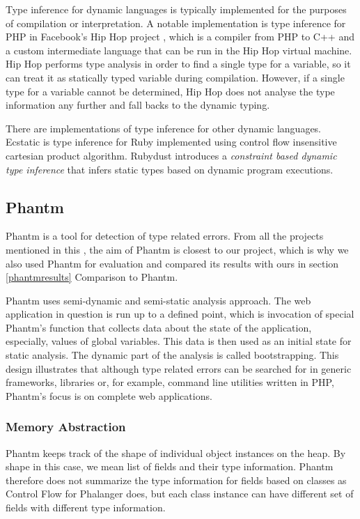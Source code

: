     Type inference for dynamic languages is typically implemented 
    for the purposes of compilation or interpretation. A notable implementation 
    is type inference for PHP in Facebook's Hip Hop project \cite{zhao2012hiphop}, 
    which is a compiler from PHP to C++ and a custom intermediate language 
    that can be run in the Hip Hop virtual machine. Hip Hop performs type 
    analysis in order to find a single type for a variable, so it can treat 
    it as statically typed variable during compilation. However, if a single 
    type for a variable cannot be determined, Hip Hop does not analyse 
    the type information any further and fall backs to the dynamic typing.    
        
    There are implementations of type inference for other dynamic languages. 
    Ecstatic\cite{madsen2007ecstatic} is type inference for Ruby 
    implemented using control flow insensitive cartesian product algorithm. 
    Rubydust\cite{an2011dynamic} introduces a \emph{constraint based dynamic 
    type inference} that infers static types based on dynamic program 
    executions.

    \subsection{Phantm}
    
    Phantm\cite{kneuss2010phantm} is a tool for detection of type related 
    errors. From all the projects mentioned in this \wchapter{}, the aim of 
    Phantm is closest to our project, which is why we also used Phantm 
    for evaluation and compared its results with ours in 
    section \ref{phantmresults} Comparison to Phantm.
    
    Phantm uses semi-dynamic and semi-static analysis approach. The web 
    application in question is run up to a defined point, which is invocation 
    of special Phantm's function that collects data about the state of the application, 
    especially, values of global variables. This data is then used as an initial 
    state for static analysis. The dynamic part of the analysis is called bootstrapping. 
    This design illustrates that although type related errors can be searched for 
    in generic frameworks, libraries or, for example, command line utilities 
    written in PHP, Phantm's focus is on complete web applications.
    
    \subsubsection*{Memory Abstraction}
    Phantm keeps track of the shape of individual object instances on the heap. 
    By shape in this case, we mean list of fields and their type information. 
    Phantm therefore does not summarize the type information for fields based 
    on classes as Control Flow for Phalanger does, but each class instance 
    can have different set of fields with different type information.
    
